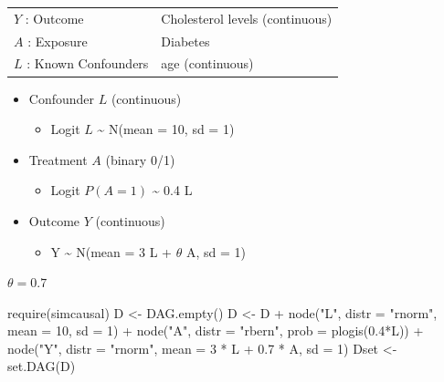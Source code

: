 \documentclass[
]{book}
\newenvironment{Shaded}{\begin{snugshade}}{\end{snugshade}}
\newcommand{\AttributeTok}[1]{\textcolor[rgb]{0.77,0.63,0.00}{#1}}
\newcommand{\DecValTok}[1]{\textcolor[rgb]{0.00,0.00,0.81}{#1}}
\newcommand{\FloatTok}[1]{\textcolor[rgb]{0.00,0.00,0.81}{#1}}
\newcommand{\FunctionTok}[1]{\textcolor[rgb]{0.00,0.00,0.00}{#1}}
\newcommand{\NormalTok}[1]{#1}
\newcommand{\OtherTok}[1]{\textcolor[rgb]{0.56,0.35,0.01}{#1}}
\newcommand{\SpecialCharTok}[1]{\textcolor[rgb]{0.00,0.00,0.00}{#1}}
\newcommand{\StringTok}[1]{\textcolor[rgb]{0.31,0.60,0.02}{#1}}
\providecommand{\tightlist}{%
  \setlength{\itemsep}{0pt}\setlength{\parskip}{0pt}}
\begin{document}
\begin{longtable}[]{@{}ll@{}}
\toprule
\endhead
\(Y\) : Outcome & Cholesterol levels (continuous)\tabularnewline
\(A\) : Exposure & Diabetes\tabularnewline
\(L\) : Known Confounders & age (continuous)\tabularnewline
\bottomrule
\end{longtable}

\begin{itemize}
\tightlist
\item
  Confounder \(L\) (continuous)

  \begin{itemize}
  \tightlist
  \item
    Logit \(L\) \textasciitilde{} N(mean = 10, sd = 1)
  \end{itemize}
\item
  Treatment \(A\) (binary 0/1)

  \begin{itemize}
  \tightlist
  \item
    Logit \(P(A = 1)\) \textasciitilde{} 0.4 L
  \end{itemize}
\item
  Outcome \(Y\) (continuous)

  \begin{itemize}
  \tightlist
  \item
    Y \textasciitilde{} N(mean = 3 L + \(\theta\) A, sd = 1)
  \end{itemize}
\end{itemize}

\(\theta = 0.7\)

\begin{Shaded}
\begin{Highlighting}[]
\FunctionTok{require}\NormalTok{(simcausal)}
\NormalTok{D }\OtherTok{\textless{}{-}} \FunctionTok{DAG.empty}\NormalTok{()}
\NormalTok{D }\OtherTok{\textless{}{-}}\NormalTok{ D }\SpecialCharTok{+}
  \FunctionTok{node}\NormalTok{(}\StringTok{"L"}\NormalTok{, }\AttributeTok{distr =} \StringTok{"rnorm"}\NormalTok{, }\AttributeTok{mean =} \DecValTok{10}\NormalTok{, }\AttributeTok{sd =} \DecValTok{1}\NormalTok{) }\SpecialCharTok{+}
  \FunctionTok{node}\NormalTok{(}\StringTok{"A"}\NormalTok{, }\AttributeTok{distr =} \StringTok{"rbern"}\NormalTok{, }\AttributeTok{prob =} \FunctionTok{plogis}\NormalTok{(}\FloatTok{0.4}\SpecialCharTok{*}\NormalTok{L)) }\SpecialCharTok{+}
  \FunctionTok{node}\NormalTok{(}\StringTok{"Y"}\NormalTok{, }\AttributeTok{distr =} \StringTok{"rnorm"}\NormalTok{, }\AttributeTok{mean =} \DecValTok{3} \SpecialCharTok{*}\NormalTok{ L }\SpecialCharTok{+} \FloatTok{0.7} \SpecialCharTok{*}\NormalTok{ A, }\AttributeTok{sd =} \DecValTok{1}\NormalTok{)}
\NormalTok{Dset }\OtherTok{\textless{}{-}} \FunctionTok{set.DAG}\NormalTok{(D)}
\end{Highlighting}
\end{Shaded}
\end{document}

